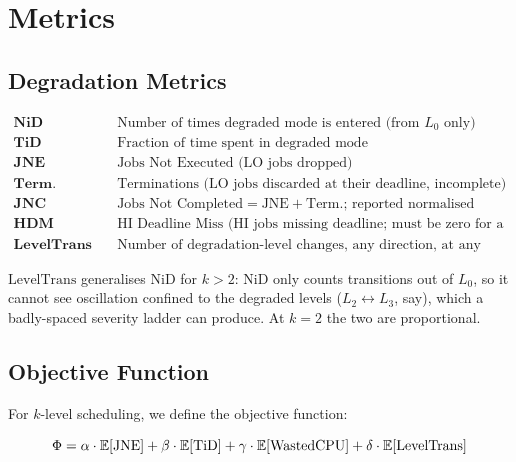 \section{Metrics}

\subsection{Degradation Metrics}

\begin{align*}
\textbf{NiD} &\quad \text{Number of times degraded mode is entered (from } L_0 \text{ only)} \\
\textbf{TiD} &\quad \text{Fraction of time spent in degraded mode} \\
\textbf{JNE} &\quad \text{Jobs Not Executed (LO jobs dropped)} \\
\textbf{Term.} &\quad \text{Terminations (LO jobs discarded at their deadline, incomplete)} \\
\textbf{JNC} &\quad \text{Jobs Not Completed} = \text{JNE} + \text{Term.}\text{; reported normalised} \\
\textbf{HDM} &\quad \text{HI Deadline Miss (HI jobs missing deadline; must be zero for a safe scheme)} \\
\textbf{LevelTrans} &\quad \text{Number of degradation-level changes, any direction, at any depth}
\end{align*}

$\mathrm{LevelTrans}$ generalises $\mathrm{NiD}$ for $k > 2$: $\mathrm{NiD}$ only
counts transitions out of $L_0$, so it cannot see oscillation confined to the
degraded levels ($L_2 \leftrightarrow L_3$, say), which a badly-spaced severity
ladder can produce. At $k = 2$ the two are proportional.

\subsection{Objective Function}
\label{sec:objective-function}

For $k$-level scheduling, we define the objective function:

\[
\Phi = \alpha \cdot \mathbb{E}[\mathrm{JNE}] + \beta \cdot \mathbb{E}[\mathrm{TiD}] + \gamma \cdot \mathbb{E}[\mathrm{WastedCPU}] + \delta \cdot \mathbb{E}[\mathrm{LevelTrans}]
\]

